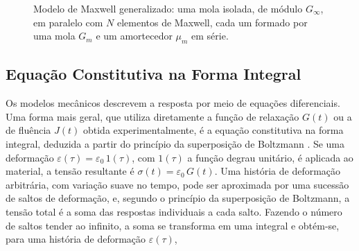 \documentclass[arial,centeredequations,english,brazilian,oneside,section=TITLE]{ifes8}
\begin{document}
\begin{figure}[h]
  \centering
  \caption{Modelo de Maxwell generalizado: uma mola isolada, de módulo $G_{\infty}$, em
    paralelo com $N$ elementos de Maxwell, cada um formado por uma mola $G_m$ e um
    amortecedor $\mu_m$ em série.}
  \label{fig:maxwell-generalizado}
\end{figure}

\subsection{Equação Constitutiva na Forma Integral}
\label{sub:forma-integral}

Os modelos mecânicos descrevem a resposta por meio de equações diferenciais. Uma forma
mais geral, que utiliza diretamente a função de relaxação $G(t)$ ou a de fluência $J(t)$
obtida experimentalmente, é a equação constitutiva na forma integral, deduzida a partir
do princípio da superposição de Boltzmann \cite{Pagliosa2004}. Se uma deformação
$\varepsilon(\tau) = \varepsilon_0\,1(\tau)$, com $1(\tau)$ a função degrau unitário, é
aplicada ao material, a tensão resultante é $\sigma(t) = \varepsilon_0\,G(t)$. Uma
história de deformação arbitrária, com variação suave no tempo, pode ser aproximada por
uma sucessão de saltos de deformação, e, segundo o princípio da superposição de
Boltzmann, a tensão total é a soma das respostas individuais a cada salto.
Fazendo o número de saltos tender ao infinito, a soma se
transforma em uma integral e obtém-se, para uma história de deformação $\varepsilon(\tau)$,
\end{document}
